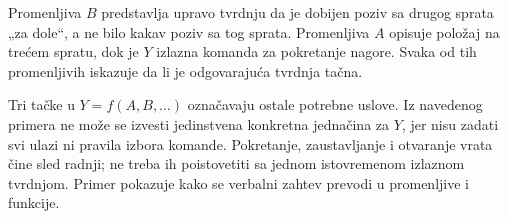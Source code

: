 
Promenljiva \(B\) predstavlja upravo tvrdnju da je dobijen poziv sa drugog sprata „za dole“, a ne bilo kakav poziv sa tog sprata. Promenljiva \(A\) opisuje položaj na trećem spratu, dok je \(Y\) izlazna komanda za pokretanje nagore. Svaka od tih promenljivih iskazuje da li je odgovarajuća tvrdnja tačna.

Tri tačke u \(Y=f(A,B,\ldots)\) označavaju ostale potrebne uslove. Iz navedenog primera ne može se izvesti jedinstvena konkretna jednačina za \(Y\), jer nisu zadati svi ulazi ni pravila izbora komande. Pokretanje, zaustavljanje i otvaranje vrata čine sled radnji; ne treba ih poistovetiti sa jednom istovremenom izlaznom tvrdnjom. Primer pokazuje kako se verbalni zahtev prevodi u promenljive i funkcije.
